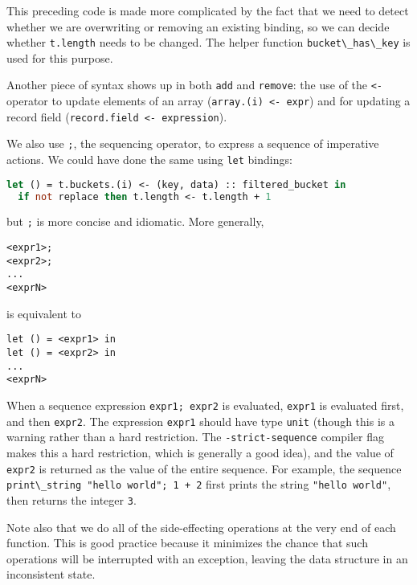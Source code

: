 This preceding code is made more complicated by the fact that we need to
detect whether we are overwriting or removing an existing binding, so we
can decide whether \passthrough{\lstinline!t.length!} needs to be
changed. The helper function \passthrough{\lstinline!bucket\_has\_key!}
is used for this purpose.

Another piece of syntax shows up in both \passthrough{\lstinline!add!}
and \passthrough{\lstinline!remove!}: the use of the
\passthrough{\lstinline!<-!} operator to update elements of an array
(\passthrough{\lstinline!array.(i) <- expr!}) and for updating a record
field (\passthrough{\lstinline!record.field <- expression!}).

We also use \passthrough{\lstinline!;!}, the sequencing operator, to
express a sequence of imperative actions. We could have done the same
using \passthrough{\lstinline!let!} bindings:

\begin{lstlisting}[language=Caml]
let () = t.buckets.(i) <- (key, data) :: filtered_bucket in
  if not replace then t.length <- t.length + 1
\end{lstlisting}

but \passthrough{\lstinline!;!} is more concise and idiomatic. More
generally,

\begin{lstlisting}
<expr1>;
<expr2>;
...
<exprN>
\end{lstlisting}

is equivalent to

\begin{lstlisting}
let () = <expr1> in
let () = <expr2> in
...
<exprN>
\end{lstlisting}

When a sequence expression \passthrough{\lstinline!expr1; expr2!} is
evaluated, \passthrough{\lstinline!expr1!} is evaluated first, and then
\passthrough{\lstinline!expr2!}. The expression
\passthrough{\lstinline!expr1!} should have type
\passthrough{\lstinline!unit!} (though this is a warning rather than a
hard restriction. The \passthrough{\lstinline!-strict-sequence!}
compiler flag makes this a hard restriction, which is generally a good
idea), and the value of \passthrough{\lstinline!expr2!} is returned as
the value of the entire sequence. For example, the sequence
\passthrough{\lstinline!print\_string "hello world"; 1 + 2!} first
prints the string \passthrough{\lstinline!"hello world"!}, then returns
the integer \passthrough{\lstinline!3!}.

Note also that we do all of the side-effecting operations at the very
end of each function. This is good practice because it minimizes the
chance that such operations will be interrupted with an exception,
leaving the data structure in an inconsistent state. ~~

